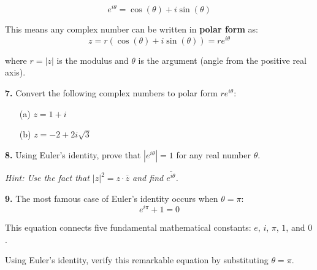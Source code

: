 \documentclass[12pt]{article}
\begin{document}
$$e^{i\theta} = \cos(\theta) + i\sin(\theta)$$

This means any complex number can be written in \textbf{polar form} as:
$$z = r(\cos(\theta) + i\sin(\theta)) = re^{i\theta}$$

where $r = |z|$ is the modulus and $\theta$ is the argument (angle from the positive real axis).

\textbf{7.} Convert the following complex numbers to polar form $re^{i\theta}$:

\begin{enumerate}
\item[(a)] $z = 1 + i$
\vspace{3cm}

\item[(b)] $z = -2 + 2i\sqrt{3}$
\vspace{3cm}
\end{enumerate}

\textbf{8.} Using Euler's identity, prove that $|e^{i\theta}| = 1$ for any real number $\theta$.

\textit{Hint: Use the fact that $|z|^2 = z \cdot \overline{z}$ and find $\overline{e^{i\theta}}$.}
\vspace{4cm}

\textbf{9.} The most famous case of Euler's identity occurs when $\theta = \pi$:
$$e^{i\pi} + 1 = 0$$

This equation connects five fundamental mathematical constants: $e$, $i$, $\pi$, $1$, and $0$.

Using Euler's identity, verify this remarkable equation by substituting $\theta = \pi$.
\vspace{3cm}
\end{document}

